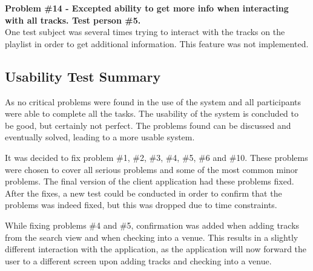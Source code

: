 \noindent\textbf{Problem \#14 - Excepted ability to get more info when interacting with all
    tracks. Test person \#5.}\\
  One test subject was several times trying to interact with the
  tracks on the playlist in order to get additional information. This
  feature was not implemented.

\subsection{Usability Test Summary}
As no critical problems were found in the use of the system and all participants were able to complete all the tasks. The usability of the system is concluded to be good, but certainly not perfect. The problems found can be discussed and eventually solved, leading to a more usable system.

It was decided to fix problem \#1, \#2, \#3, \#4, \#5, \#6 and
\#10. These problems were chosen to cover all serious problems and
some of the most common minor problems. The final version of the
client application had these problems fixed. After the fixes, a new test
could be conducted in order to confirm that the problems was indeed
fixed, but this was dropped due to time constraints.

While fixing problems \#4 and \#5, confirmation was added when adding
tracks from the search view and when checking into a venue. This results in a slightly different
interaction with the application, as the application will now forward
the user to a different screen upon adding tracks and checking into a venue.
